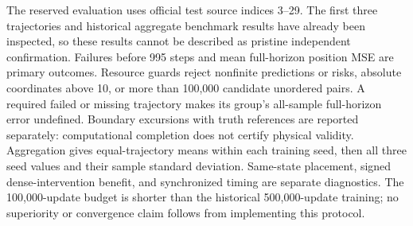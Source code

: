 The reserved evaluation uses official test source indices 3--29. The first
three trajectories and historical aggregate benchmark results have already
been inspected, so these results cannot be described as pristine independent
confirmation. Failures before 995 steps and mean full-horizon position MSE
are primary outcomes. Resource guards reject nonfinite predictions or risks,
absolute coordinates above 10, or more than 100,000 candidate unordered pairs.
A required failed or missing trajectory makes its group's all-sample
full-horizon error undefined. Boundary excursions with truth references are
reported separately: computational completion does not certify physical
validity. Aggregation gives equal-trajectory means within each training seed,
then all three seed values and their sample standard deviation. Same-state
placement, signed dense-intervention benefit, and synchronized timing are
separate diagnostics. The 100,000-update budget is shorter than the historical
500,000-update training; no superiority or convergence claim follows from
implementing this protocol.


